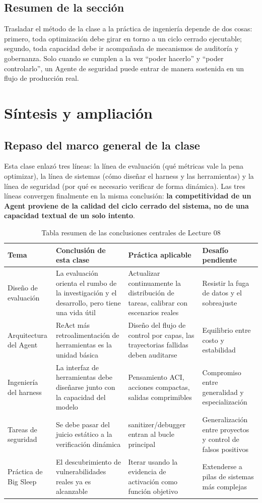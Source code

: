 \documentclass[a4paper]{article}
\begin{document}
\subsection{Resumen de la sección}
Trasladar el método de la clase a la práctica de ingeniería depende de dos cosas: primero, toda optimización debe girar en torno a un ciclo cerrado ejecutable; segundo, toda capacidad debe ir acompañada de mecanismos de auditoría y gobernanza. Solo cuando se cumplen a la vez ``poder hacerlo'' y ``poder controlarlo'', un Agente de seguridad puede entrar de manera sostenida en un flujo de producción real.

\section{Síntesis y ampliación}

\subsection{Repaso del marco general de la clase}
Esta clase enlazó tres líneas: la línea de evaluación (qué métricas vale la pena optimizar), la línea de sistemas (cómo diseñar el harness y las herramientas) y la línea de seguridad (por qué es necesario verificar de forma dinámica). Las tres líneas convergen finalmente en la misma conclusión: \textbf{la competitividad de un Agent proviene de la calidad del ciclo cerrado del sistema, no de una capacidad textual de un solo intento}.

\begin{table}[H]
\centering
\begin{tabular}{p{3.1cm}p{4.4cm}p{4.2cm}p{2.6cm}}
\toprule
\textbf{Tema} & \textbf{Conclusión de esta clase} & \textbf{Práctica aplicable} & \textbf{Desafío pendiente} \\
\midrule
Diseño de evaluación & La evaluación orienta el rumbo de la investigación y el desarrollo, pero tiene una vida útil & Actualizar continuamente la distribución de tareas, calibrar con escenarios reales & Resistir la fuga de datos y el sobreajuste \\
Arquitectura del Agent & ReAct más retroalimentación de herramientas es la unidad básica & Diseño del flujo de control por capas, las trayectorias fallidas deben auditarse & Equilibrio entre costo y estabilidad \\
Ingeniería del harness & La interfaz de herramientas debe diseñarse junto con la capacidad del modelo & Pensamiento ACI, acciones compactas, salidas comprimibles & Compromiso entre generalidad y especialización \\
Tareas de seguridad & Se debe pasar del juicio estático a la verificación dinámica & sanitizer/debugger entran al bucle principal & Generalización entre proyectos y control de falsos positivos \\
Práctica de Big Sleep & El descubrimiento de vulnerabilidades reales ya es alcanzable & Iterar usando la evidencia de activación como función objetivo & Extenderse a pilas de sistemas más complejas \\
\bottomrule
\end{tabular}
\caption{Tabla resumen de las conclusiones centrales de Lecture 08}
\end{table}
\end{document}
